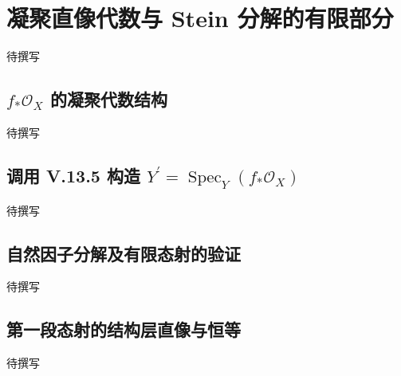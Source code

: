 
% 
% 
% 

\section{凝聚直像代数与 Stein 分解的有限部分}
\label{g5:sec:2103}

待撰写

\subsection{\texorpdfstring{\(f_*\mathcal O_X\) 的凝聚代数结构}{f\_*O\_X 的凝聚代数结构}}
\label{g5:subsec:2103:01}
待撰写

\subsection{\texorpdfstring{调用 V.13.5 构造 \(Y^\prime=\operatorname{Spec}_Y(f_*\mathcal O_X)\)}{调用 V.13.5 构造 Y′=Spec\_Y(f\_*O\_X)}}
\label{g5:subsec:2103:02}
待撰写

\subsection{自然因子分解及有限态射的验证}
\label{g5:subsec:2103:03}
待撰写

\subsection{第一段态射的结构层直像与恒等}
\label{g5:subsec:2103:04}
待撰写
